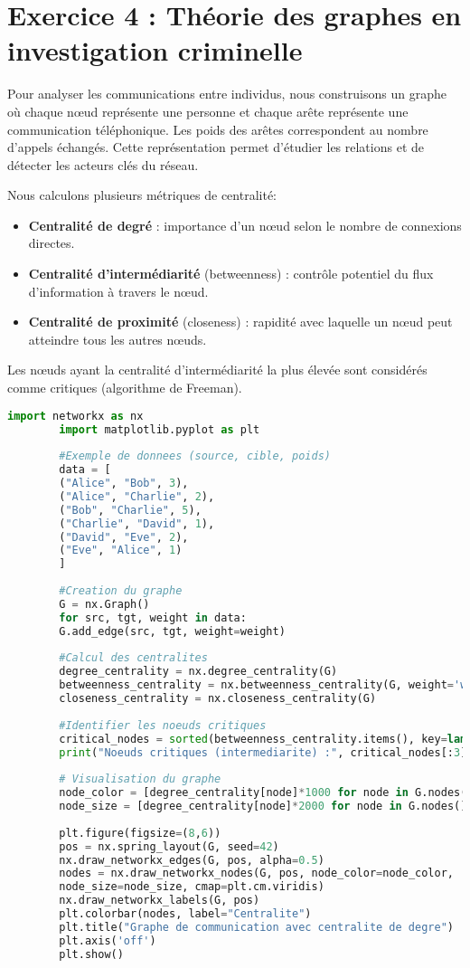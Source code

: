 \documentclass[12pt,a4paper]{report}
\begin{document}
	
	\section*{Exercice 4 : Théorie des graphes en investigation criminelle}
	

	
	Pour analyser les communications entre individus, nous construisons un graphe où chaque nœud représente une personne et chaque arête représente une communication téléphonique. Les poids des arêtes correspondent au nombre d'appels échangés. Cette représentation permet d'étudier les relations et de détecter les acteurs clés du réseau.
	
	Nous calculons plusieurs métriques de centralité:
	\begin{itemize}
		\item \textbf{Centralité de degré} : importance d'un nœud selon le nombre de connexions directes.
		\item \textbf{Centralité d'intermédiarité} (betweenness) : contrôle potentiel du flux d'information à travers le nœud.
		\item \textbf{Centralité de proximité} (closeness) : rapidité avec laquelle un nœud peut atteindre tous les autres nœuds.
	\end{itemize}
	
	Les nœuds ayant la centralité d'intermédiarité la plus élevée sont considérés comme critiques (algorithme de Freeman).
	
	\begin{lstlisting}[language=Python, caption=Construction et analyse du graphe, label=lst:graph_analysis]
		import networkx as nx
		import matplotlib.pyplot as plt
		
		#Exemple de donnees (source, cible, poids)
		data = [
		("Alice", "Bob", 3),
		("Alice", "Charlie", 2),
		("Bob", "Charlie", 5),
		("Charlie", "David", 1),
		("David", "Eve", 2),
		("Eve", "Alice", 1)
		]
		
		#Creation du graphe
		G = nx.Graph()
		for src, tgt, weight in data:
		G.add_edge(src, tgt, weight=weight)
		
		#Calcul des centralites
		degree_centrality = nx.degree_centrality(G)
		betweenness_centrality = nx.betweenness_centrality(G, weight='weight')
		closeness_centrality = nx.closeness_centrality(G)
		
		#Identifier les noeuds critiques
		critical_nodes = sorted(betweenness_centrality.items(), key=lambda x: x[1], reverse=True)
		print("Noeuds critiques (intermediarite) :", critical_nodes[:3])
		
		# Visualisation du graphe
		node_color = [degree_centrality[node]*1000 for node in G.nodes()]
		node_size = [degree_centrality[node]*2000 for node in G.nodes()]
		
		plt.figure(figsize=(8,6))
		pos = nx.spring_layout(G, seed=42)
		nx.draw_networkx_edges(G, pos, alpha=0.5)
		nodes = nx.draw_networkx_nodes(G, pos, node_color=node_color,
		node_size=node_size, cmap=plt.cm.viridis)
		nx.draw_networkx_labels(G, pos)
		plt.colorbar(nodes, label="Centralite")
		plt.title("Graphe de communication avec centralite de degre")
		plt.axis('off')
		plt.show()
	\end{lstlisting}
	
\end{document}
